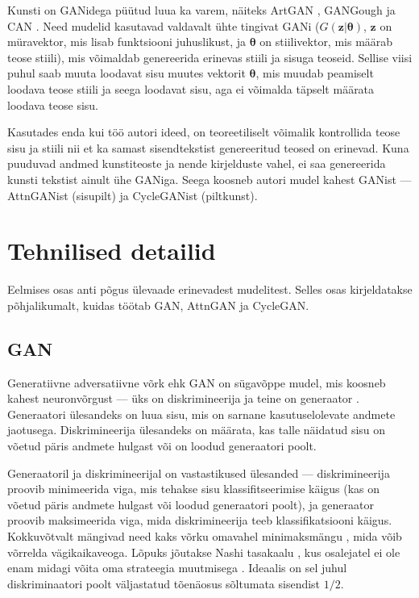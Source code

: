 \documentclass{vilgym}
\begin{document}
	Kunsti on GANidega püütud luua ka varem, näiteks ArtGAN \parencite{artgan}, GANGough \parencite{gangough} ja CAN \parencite{can}. Need mudelid kasutavad valdavalt ühte tingivat GANi ($ G(\boldsymbol{z}|\boldsymbol{\theta}) $, $ \boldsymbol{z} $ on müravektor, mis lisab funktsiooni juhuslikust, ja $ \boldsymbol{\theta} $ on stiilivektor, mis määrab teose stiili), mis võimaldab genereerida erinevas stiili ja sisuga teoseid. Sellise viisi puhul saab muuta loodavat sisu muutes vektorit $ \boldsymbol{\theta} $, mis muudab peamiselt loodava teose stiili ja seega loodavat sisu, aga ei võimalda täpselt määrata loodava teose sisu. 

	Kasutades enda kui töö autori ideed, on teoreetiliselt võimalik kontrollida teose sisu ja stiili nii et ka samast sisendtekstist genereeritud teosed on erinevad. Kuna puuduvad andmed kunstiteoste ja nende kirjelduste vahel, ei saa genereerida kunsti tekstist ainult ühe GANiga. Seega koosneb autori mudel kahest GANist --- AttnGANist (sisu\textrightarrow pilt) ja CycleGANist (pilt\textrightarrow kunst). %

	\section{Tehnilised detailid}
	Eelmises osas anti põgus ülevaade erinevadest mudelitest. Selles osas kirjeldatakse põhjalikumalt, kuidas töötab GAN, AttnGAN ja CycleGAN.

	\subsection{GAN}
	Generatiivne adversatiivne võrk ehk GAN  on sügavõppe mudel, mis koosneb kahest neuronvõrgust --- üks on diskrimineerija  ja teine on generaator .  Generaatori ülesandeks on luua sisu, mis on sarnane kasutuselolevate andmete jaotusega. Diskrimineerija ülesandeks on määrata, kas talle näidatud sisu on võetud päris andmete hulgast või on loodud generaatori poolt.
	
	Generaatoril ja diskrimineerijal on vastastikused ülesanded --- diskrimineerija proovib minimeerida viga, mis tehakse sisu klassifitseerimise käigus (kas on võetud päris andmete hulgast või loodud generaatori poolt), ja generaator proovib maksimeerida viga, mida diskrimineerija teeb klassifikatsiooni käigus. Kokkuvõtvalt mängivad need kaks võrku omavahel minimaksmängu , mida võib võrrelda vägikaikaveoga. Lõpuks jõutakse Nashi tasakaalu , kus osalejatel ei ole enam midagi võita oma strateegia muutmisega \parencite{gametheory}. Ideaalis on sel juhul diskriminaatori poolt väljastatud tõenäosus sõltumata sisendist $ 1/2 $.
\end{document}
